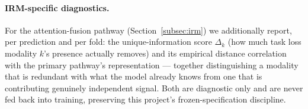 \paragraph{IRM-specific diagnostics.} For the attention-fusion pathway (Section~\ref{subsec:irm})
we additionally report, per prediction and per fold: the unique-information score $\Delta_k$
(how much task loss modality $k$'s presence actually removes) and its empirical distance
correlation~\cite{szekely2007dcor} with the primary pathway's representation --- together
distinguishing a modality that is redundant with what the model already knows from one that is
contributing genuinely independent signal. Both are diagnostic only and are never fed back into
training, preserving this project's frozen-specification discipline.
